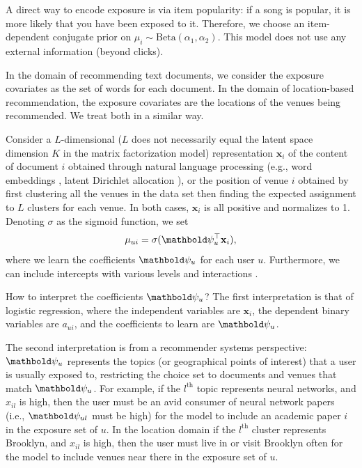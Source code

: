  A direct way to encode exposure is via item
popularity: if a song is popular, it is more likely that you have been
exposed to it. Therefore, we choose an item-dependent conjugate prior on
$\mu_i \sim \mathrm{Beta}(\alpha_1, \alpha_2)$. This model does not use
any external information (beyond clicks). 

In the domain of recommending text documents, 
we consider the exposure covariates as the set of words 
for each document. 
In the domain of location-based recommendation, 
the exposure covariates are the locations of the venues being recommended. 
We treat both in a similar way. 

Consider a $L$-dimensional ($L$ does not necessarily equal the latent space dimension $K$ in the matrix factorization model) representation $\mathbf{x}_i$ 
of the content of document $i$ 
obtained through natural language processing (e.g., word embeddings \cite{mikolov2013distributed}, latent Dirichlet allocation \cite{blei2003latent}), 
or the position of venue $i$ obtained by first clustering all the venues in the data set 
then finding the expected assignment to $L$ clusters 
for each venue. 
In both cases, $\mathbf{x}_i$ is all positive and normalizes to 1. 
Denoting $\sigma$ as the sigmoid function, 
we set
\begin{equation}
	\mu_{ui} = \sigma(\mb\psi_u^\top \mathbf{x}_i), 
\end{equation}
where we learn the coefficients $\mb\psi_u$ 
for each user $u$. Furthermore, we can include intercepts with various levels and interactions \cite{gelman2006data}. 

How to interpret the coefficients $\mb\psi_u$? 
The first interpretation is that of logistic regression, 
where the independent variables are $\mathbf{x}_i$, 
the dependent binary variables are $a_{ui}$, 
and the coefficients to learn are $\mb\psi_u$. 

The second interpretation is from a recommender systems perspective: 
$\mb\psi_u$ represents the topics (or geographical points of interest) that a user is usually exposed to, 
restricting the choice set to documents and venues that match $\mb\psi_u$. 
For example, if the $l^\mathrm{th}$ topic represents neural networks, 
and $x_{il}$ is high, 
then the user must be an avid consumer of neural network papers 
(i.e., $\mb\psi_{ul}$ must be high) 
for the model to include an academic paper $i$ in the exposure set of $u$.
In the location domain if the $l^\mathrm{th}$ cluster represents Brooklyn, 
and $x_{il}$ is high, 
then the user must live in or visit Brooklyn often 
for the model to include venues near there in the exposure set of $u$. 



